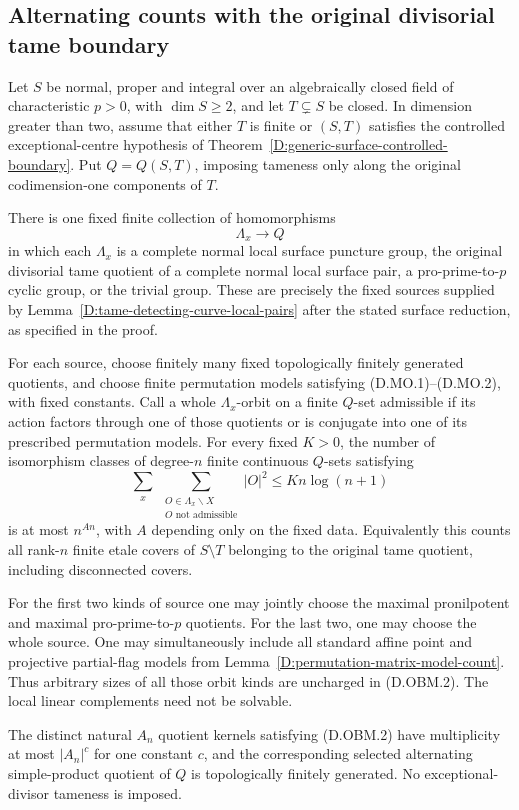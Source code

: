 \subsection{Alternating counts with the original divisorial tame boundary}

\begin{theorem}
\label{D:original-boundary-matrix-alternating-count}
Let $S$ be normal, proper and integral over an algebraically
closed field of characteristic $p>0$, with $\dim S\ge2$, and let
$T\subsetneq S$ be closed. In dimension greater than two, assume
that either $T$ is finite or $(S,T)$ satisfies the controlled
exceptional-centre hypothesis of
Theorem~\ref{D:generic-surface-controlled-boundary}. Put
$Q=Q(S,T)$, imposing tameness only along the original
codimension-one components of $T$.

There is one fixed finite collection of homomorphisms
\[
                         \Lambda_x\longrightarrow Q     \tag{D.OBM.1}
\]
in which each $\Lambda_x$ is a complete normal local surface
puncture group, the original divisorial tame quotient of a
complete normal local surface pair, a pro-prime-to-$p$ cyclic
group, or the trivial group. These are precisely the fixed
sources supplied by Lemma~\ref{D:tame-detecting-curve-local-pairs}
after the stated surface reduction, as specified in the proof.

For each source, choose finitely many fixed topologically
finitely generated quotients, and choose finite permutation
models satisfying (D.MO.1)--(D.MO.2), with fixed constants.
Call a whole $\Lambda_x$-orbit on a finite $Q$-set admissible
if its action factors through one of those quotients or is
conjugate into one of its prescribed permutation models.
For every fixed $K>0$, the number of isomorphism classes of
degree-$n$ finite continuous $Q$-sets satisfying
\[
       \sum_x\
       \sum_{\substack{O\in\Lambda_x\backslash X\\
                       O\text{ not admissible}}}|O|^2
                              \le K n\log(n+1)           \tag{D.OBM.2}
\]
is at most $n^{A n}$, with $A$ depending only on the fixed
data. Equivalently this counts all rank-$n$ finite etale
covers of $S\setminus T$ belonging to the original tame
quotient, including disconnected covers.

For the first two kinds of source one may jointly choose
the maximal pronilpotent and maximal pro-prime-to-$p$
quotients. For the last two, one may choose the whole source.
One may simultaneously include all standard affine point
and projective partial-flag models from
Lemma~\ref{D:permutation-matrix-model-count}. Thus arbitrary
sizes of all those orbit kinds are uncharged in (D.OBM.2).
The local linear complements need not be solvable.

The distinct natural $A_n$ quotient kernels satisfying
(D.OBM.2) have multiplicity at most $|A_n|^c$ for one
constant $c$, and the corresponding selected alternating
simple-product quotient of $Q$ is topologically finitely
generated. No exceptional-divisor tameness is imposed.
\end{theorem}

